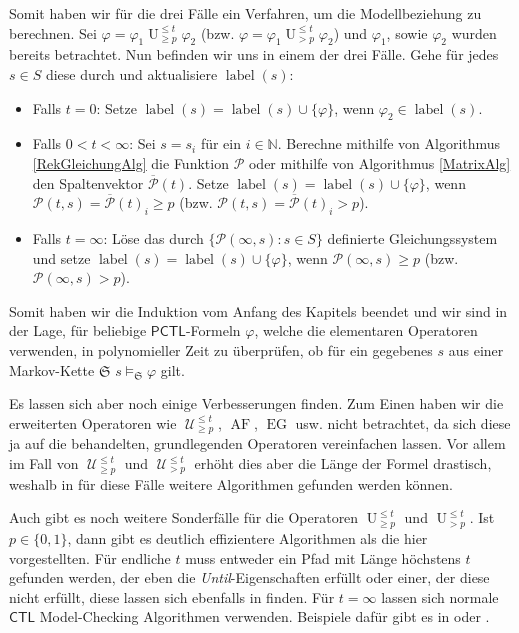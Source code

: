 \documentclass{lni}
\theoremstyle{def_style}
\theoremstyle{break}
\newcommand{\UEqual}[4]{#1\operatorname{U}^{\leq #2}_{\geq #3}#4}
\newcommand{\UStrict}[4]{#1\operatorname{U}^{\leq #2}_{> #3}#4}
\newcommand{\WeakEqual}[4]{#1\operatorname{\mathcal{U}}^{\leq #2}_{\geq #3}#4}
\newcommand{\WeakStrict}[4]{#1\operatorname{\mathcal{U}}^{\leq #2}_{> #3}#4}
\newcommand{\CTL}{\mathsf{CTL}}
\newcommand{\PCTL}{\mathsf{PCTL}}
\begin{document}
Somit haben wir für die drei Fälle ein Verfahren, um die Modellbeziehung zu berechnen. Sei $\varphi = \UEqual{\varphi_1}{t}{p}{\varphi_2}$ (bzw. $\varphi = \UStrict{\varphi_1}{t}{p}{\varphi_2}$) und $\varphi_1$, sowie $\varphi_2$ wurden bereits betrachtet.
Nun befinden wir uns in einem der drei Fälle. Gehe für jedes $s\in S$ diese durch und aktualisiere $\operatorname{label}(s)$:
\begin{itemize}
	\item Falls $t=0$: Setze $\operatorname{label}(s) = \operatorname{label}(s)\cup \{\varphi\}$, wenn $\varphi_2\in \operatorname{label}(s)$.
	
	\item Falls $0<t<\infty$: Sei $s=s_i$ für ein $i\in \mathbb{N}$. Berechne mithilfe von Algorithmus \ref{RekGleichungAlg} die Funktion $\mathcal{P}$ oder mithilfe von Algorithmus \ref{MatrixAlg} den Spaltenvektor $\overline{\mathcal{P}}(t)$. 
	Setze $\operatorname{label}(s) = \operatorname{label}(s)\cup \{\varphi\}$, wenn $\mathcal{P}(t,s)=\overline{\mathcal{P}}(t)_i \geq p$ (bzw. $\mathcal{P}(t,s)=\overline{\mathcal{P}}(t)_i > p$).
	
	\item Falls $t=\infty$: Löse das durch $\{\mathcal{P}(\infty,s) : s\in S\}$ definierte Gleichungssystem und setze $\operatorname{label}(s) = \operatorname{label}(s)\cup \{\varphi\}$, wenn $\mathcal{P}(\infty,s) \geq p$ (bzw. $\mathcal{P}(\infty,s) > p$).
\end{itemize}
Somit haben wir die Induktion vom Anfang des Kapitels beendet und wir sind in der Lage, für beliebige $\PCTL$-Formeln $\varphi$, welche die elementaren Operatoren verwenden, in polynomieller Zeit zu überprüfen, ob für ein gegebenes $s$ aus einer Markov-Kette $\mathfrak{S}$ $s\models_\mathfrak{S} \varphi$ gilt.

Es lassen sich aber noch einige Verbesserungen finden. 
Zum Einen haben wir die erweiterten Operatoren wie $\WeakEqual{}{t}{p}{}$, $\operatorname{AF}$, $\operatorname{EG}$ usw. nicht betrachtet, da sich diese ja auf die behandelten, grundlegenden Operatoren vereinfachen lassen. 
Vor allem im Fall von $\WeakEqual{}{t}{p}{}$ und $\WeakStrict{}{t}{p}{}$ erhöht dies aber die Länge der Formel drastisch, weshalb in \cite{hansson1994logic} für diese Fälle weitere Algorithmen gefunden werden können.

Auch gibt es noch weitere Sonderfälle für die Operatoren $\UEqual{}{t}{p}{}$ und $\UStrict{}{t}{p}{}$. Ist $p\in \{0,1\}$, dann gibt es deutlich effizientere Algorithmen als die hier vorgestellten. Für endliche $t$ muss entweder ein Pfad mit Länge höchstens $t$ gefunden werden, der eben die \textit{Until}-Eigenschaften erfüllt oder einer, der diese nicht erfüllt, diese lassen sich ebenfalls in \cite{hansson1994logic} finden. Für $t=\infty$ lassen sich normale $\CTL$ Model-Checking Algorithmen verwenden. Beispiele dafür gibt es in \cite{baier2008principles} oder \cite{clarke1982design}.
\end{document}
